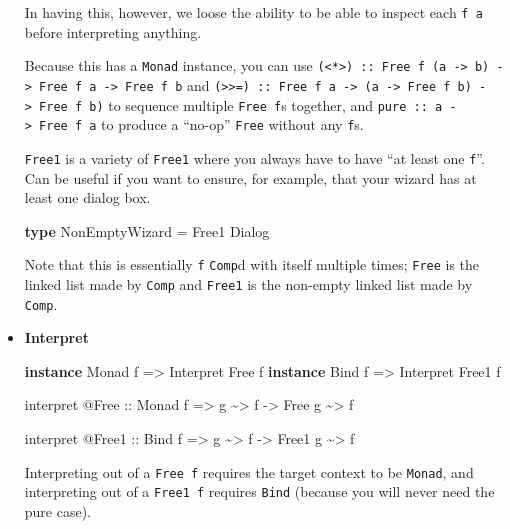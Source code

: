 \documentclass[]{article}
\newenvironment{Shaded}{}{}
\newcommand{\DataTypeTok}[1]{\textcolor[rgb]{0.56,0.13,0.00}{#1}}
\newcommand{\KeywordTok}[1]{\textcolor[rgb]{0.00,0.44,0.13}{\textbf{#1}}}
\newcommand{\NormalTok}[1]{#1}
\newcommand{\OperatorTok}[1]{\textcolor[rgb]{0.40,0.40,0.40}{#1}}
\newcommand{\OtherTok}[1]{\textcolor[rgb]{0.00,0.44,0.13}{#1}}
\begin{document}
\begin{itemize}
  In having this, however, we loose the ability to be able to inspect each
  \texttt{f\ a} before interpreting anything.

  Because this has a \texttt{Monad} instance, you can use
  \texttt{(\textless{}*\textgreater{})\ ::\ Free\ f\ (a\ -\textgreater{}\ b)\ -\textgreater{}\ Free\ f\ a\ -\textgreater{}\ Free\ f\ b}
  and
  \texttt{(\textgreater{}\textgreater{}=)\ ::\ Free\ f\ a\ -\textgreater{}\ (a\ -\textgreater{}\ Free\ f\ b)\ -\textgreater{}\ Free\ f\ b)}
  to sequence multiple \texttt{Free\ f}s together, and
  \texttt{pure\ ::\ a\ -\textgreater{}\ Free\ f\ a} to produce a ``no-op''
  \texttt{Free} without any \texttt{f}s.

  \texttt{Free1} is a variety of \texttt{Free1} where you always have to have
  ``at least one \texttt{f}''. Can be useful if you want to ensure, for example,
  that your wizard has at least one dialog box.

\begin{Shaded}
\begin{Highlighting}[]
\KeywordTok{type} \DataTypeTok{NonEmptyWizard} \OtherTok{=} \DataTypeTok{Free1} \DataTypeTok{Dialog}
\end{Highlighting}
\end{Shaded}

  Note that this is essentially \texttt{f} \texttt{Comp}d with itself multiple
  times; \texttt{Free} is the linked list made by \texttt{Comp} and
  \texttt{Free1} is the non-empty linked list made by \texttt{Comp}.
\item
  \textbf{Interpret}

\begin{Shaded}
\begin{Highlighting}[]
\KeywordTok{instance} \DataTypeTok{Monad}\NormalTok{ f }\OtherTok{=\textgreater{}} \DataTypeTok{Interpret} \DataTypeTok{Free}\NormalTok{  f}
\KeywordTok{instance} \DataTypeTok{Bind}\NormalTok{  f }\OtherTok{=\textgreater{}} \DataTypeTok{Interpret} \DataTypeTok{Free1}\NormalTok{ f}

\NormalTok{interpret }\OperatorTok{@}\DataTypeTok{Free}
\OtherTok{    ::} \DataTypeTok{Monad}\NormalTok{ f}
    \OtherTok{=\textgreater{}}\NormalTok{ g }\OperatorTok{\textasciitilde{}\textgreater{}}\NormalTok{ f}
    \OtherTok{{-}\textgreater{}} \DataTypeTok{Free}\NormalTok{ g }\OperatorTok{\textasciitilde{}\textgreater{}}\NormalTok{ f}

\NormalTok{interpret }\OperatorTok{@}\DataTypeTok{Free1}
\OtherTok{    ::} \DataTypeTok{Bind}\NormalTok{ f}
    \OtherTok{=\textgreater{}}\NormalTok{ g }\OperatorTok{\textasciitilde{}\textgreater{}}\NormalTok{ f}
    \OtherTok{{-}\textgreater{}} \DataTypeTok{Free1}\NormalTok{ g }\OperatorTok{\textasciitilde{}\textgreater{}}\NormalTok{ f}
\end{Highlighting}
\end{Shaded}

  Interpreting out of a \texttt{Free\ f} requires the target context to be
  \texttt{Monad}, and interpreting out of a \texttt{Free1\ f} requires
  \texttt{Bind} (because you will never need the pure case).
\end{itemize}
\end{document}
